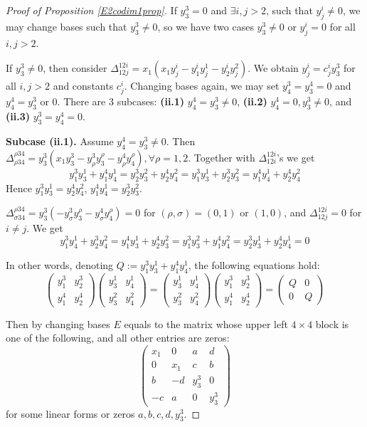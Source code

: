 \documentclass[10pt]{article} %
\theoremstyle{definition}
\begin{document}
\begin{proof}[Proof of Proposition \ref{E2codim1prop}]
If $y^3_3=0$ and $\exists i,j>2$, such that $y^i_j\neq 0$, we may change bases such that $y^3_3\neq 0$, so we have two cases $y^3_3\neq 0$ or
$y^i_j=0$ for all $i,j>2$.

If $y^3_3\neq 0$, then consider $\Delta^{12i}_{12j}=x_1(x_1y^i_j-y^i_1y^1_j-y^i_2y^2_j)$. We obtain
$y^i_j=c^i_j y^3_3$ for all $i,j>2$ and constants $c^i_j$. Changing bases again, we may set $y^3_4=y^4_3=0$ and $y^4_4=y^3_3$ or 0. There are 3 subcases: \textbf{(ii.1)} $y^4_4=y^3_3\neq0$, \textbf{(ii.2)} $y^4_4=0,y^3_3\neq0$, and \textbf{(ii.3)} $y^3_3=y^4_4=0$.

\textbf{Subcase (ii.1).} Assume $y^4_4=y^3_3\neq0$. Then $\Delta^{\rho34}_{\rho34}=y^3_3(x_1y^3_3-y^3_\rho y^\rho_3-y^4_\rho y^\rho_4),\forall \rho=1,2$. Together with $\Delta^{12i}_{12i}$'s we get
$$y^3_1 y^1_3+y^4_1 y^1_4=y^3_2 y^2_3+y^4_2 y^2_4=y^3_1y^1_3+y^3_2y^2_3=y^4_1y^1_4+y^4_2y^2_4$$
Hence $y^3_1 y^1_3=y^4_2y^2_4$, $y^4_1 y^1_4=y^3_2y^2_3$.

$\Delta^{\rho34}_{\sigma34}=y^3_3(-y^3_\sigma y^\rho_3-y^4_\sigma y^\rho_4)=0$ for $(\rho,\sigma)=(0,1)$ or $(1,0)$, and $\Delta^{12i}_{12j}=0$ for $i\neq j$.  We get
$$y^3_1y^1_4+y^3_2y^2_4=y^4_1y^1_3+y^4_2y^2_3=y^3_1y^2_3+y^4_1y^2_4=y^3_2y^1_3+y^4_2y^1_4=0$$

In other words, denoting $Q:=y^3_1 y^1_3+y^4_1 y^1_4$, the following equations hold:
$$\begin{pmatrix}
y^3_1 & y^3_2\\
y^4_1 & y^4_2
\end{pmatrix}
\begin{pmatrix}
y^1_3 & y^1_4\\
y^2_3 & y^2_4
\end{pmatrix}
=\begin{pmatrix}
y^1_3 & y^1_4\\
y^2_3 & y^2_4
\end{pmatrix}
\begin{pmatrix}
y^3_1 & y^3_2\\
y^4_1 & y^4_2
\end{pmatrix}
=\begin{pmatrix}
Q & 0\\
0 & Q
\end{pmatrix}$$

Then by changing bases $E$ equals to the matrix whose upper left $4\times 4$ block is one of the following, and all other entries are zeros:
$$\begin{pmatrix}
x_1& 0& a& d\\
0& x_1& c& b\\
b& -d& y^3_3& 0\\
-c& a& 0& y^3_3
\end{pmatrix}$$
for some linear forms or zeros $a,b,c,d,y^3_3$.


\end{proof}
\end{document}
